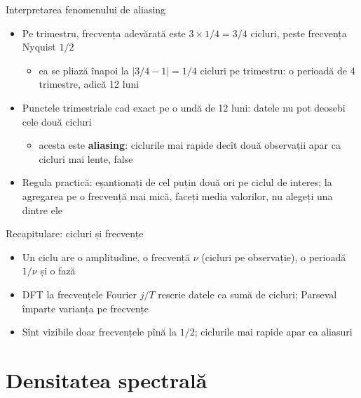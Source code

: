 \begin{frame}{Interpretarea fenomenului de aliasing}
\itemsize{\small}
\begin{itemize}
    \item Pe trimestru, frecvența adevărată este $3 \times 1/4 = 3/4$ cicluri, peste frecvența Nyquist $1/2$
    \begin{itemize}
        \item ea se pliază înapoi la $|3/4 - 1| = 1/4$ cicluri pe trimestru: o perioadă de 4 trimestre, adică 12 luni
    \end{itemize}
    \item Punctele trimestriale cad exact pe o undă de 12 luni: datele nu pot deosebi cele două cicluri
    \begin{itemize}
        \item acesta este \textbf{aliasing}: ciclurile mai rapide decît două observații apar ca cicluri mai lente, false
    \end{itemize}
    \item Regula practică: eșantionați de cel puțin două ori pe ciclul de interes; la agregarea pe o frecvență mai mică, faceți media valorilor, nu alegeți una dintre ele
\end{itemize}
\end{frame}

\begin{frame}{Recapitulare: cicluri și frecvențe}
\itemsize{\small}
\begin{itemize}
    \item Un ciclu are o amplitudine, o frecvență $\nu$ (cicluri pe observație), o perioadă $1/\nu$ și o fază
    \item DFT la frecvențele Fourier $j/T$ rescrie datele ca sumă de cicluri; Parseval împarte varianța pe frecvențe
    \item Sînt vizibile doar frecvențele pînă la $1/2$; ciclurile mai rapide apar ca aliasuri
\end{itemize}
\end{frame}


\section{Densitatea spectrală}

